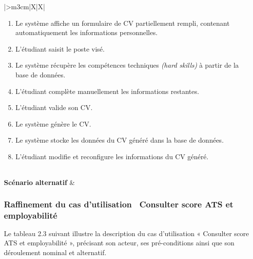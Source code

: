 \begin{table}[H]
\begin{tabularx}{\textwidth}{|>{\bfseries\centering\arraybackslash}m{3cm}|X|X|}
{\begin{minipage}[t]{\linewidth}
\begin{enumerate}[nosep,leftmargin=*]
    \item Le système affiche un formulaire de CV partiellement rempli, contenant automatiquement les informations personnelles.
    \item L'étudiant saisit le poste visé.
    \item Le système récupère les compétences techniques \textit{(hard skills)} à partir de la base de données.
    \item L'étudiant complète manuellement les informations restantes.
    \item L'étudiant valide son CV.
    \item Le système génère le CV.
    \item Le système stocke les données du CV généré dans la base de données.
    \item L’étudiant modifie et reconfigure les informations du CV généré. 
  \end{enumerate}
  \vspace{4pt}
  \end{minipage}} \\
\hline
\textbf{Scénario alternatif} &  \\
\hline
\end{tabularx}
\end{table}

\subsubsection{Raffinement du cas d'utilisation \guillemotleft~Consulter score ATS et employabilité~\guillemotright}
\label{sec:uc-consulter-score-ats}
Le tableau 2.3 suivant illustre la description du cas d’utilisation « Consulter score ATS et employabilité », précisant son acteur, ses pré-conditions ainsi que son déroulement nominal et alternatif.

